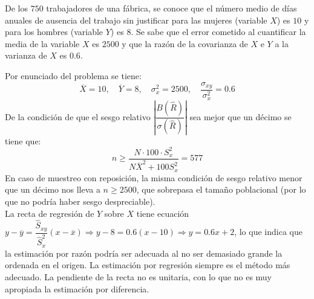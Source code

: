 \addpoints
\question[10] De los $750$ trabajadores de una fábrica, se conoce que el número medio de días anuales de ausencia del trabajo sin justificar para las mujeres (variable $X$) es $10$ y para los hombres (variable $Y$) es $8$. Se sabe que el error cometido al cuantificar la media de la variable $X$ es $2500$ y que la razón de la covarianza de $X$ e $Y$ a la varianza de $X$ es $0.6$.
\noaddpoints
{}

\begin{solution}
Por enunciado del problema se tiene:
$$\overline{X}=10,\quad \overline{Y}=8,\quad \sigma_{x}^{2}=2500,\quad \dfrac{\sigma_{xy}}{\sigma_{x}^{2}}=0.6$$
De la condición de que el sesgo relativo $|\dfrac{B(\hat{R})}{\sigma(\hat{R})}|$ sea mejor que un décimo se tiene que:
$$n \geq \dfrac{N\cdot 100 \cdot S_{x}^2}{N\overline{X}^2+100 S_{x}^2}=577$$
 En caso de muestreo con reposición, la misma condición de sesgo relativo menor que un décimo nos lleva a $n\geq 2500$, que sobrepasa el tamaño poblacional (por lo que no podría haber sesgo despreciable).\\

La recta de regresión de $Y$ sobre $X$ tiene ecuación $y-\overline{y}=\dfrac{\hat{S}_{xy}}{\hat{S}_{x}^2}(x-\overline{x}) \Rightarrow y-8=0.6(x-10) \Rightarrow y=0.6x+2$, lo que indica que la estimación por razón podría ser adecuada al no ser demasiado grande la ordenada en el origen. La estimación por regresión siempre es el método más adecuado. La pendiente de la recta no es unitaria, con lo que no es muy apropiada la estimación por diferencia.
 
 
\end{solution}

